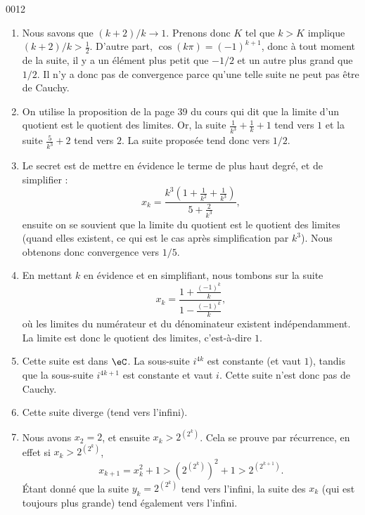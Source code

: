 
\begin{corrige}{0012}

\begin{enumerate}
\item Nous savons que $(k+2)/k\to 1$. Prenons donc $K$ tel que $k>K$ implique $(k+2)/k>\frac{ 1 }{2}$. D'autre part, $\cos(k\pi)=(-1)^{k+1}$, donc à tout moment de la suite, il y a un élément plus petit que $-1/2$ et un autre plus grand que $1/2$. Il n'y a donc pas de convergence parce qu'une telle suite ne peut pas être de Cauchy.

\item On utilise la proposition de la page 39 du cours qui dit que la limite d'un quotient est le quotient des limites. Or, la suite $\frac{1}{ k^3 }+\frac{1}{ k }+1$ tend vers $1$ et la suite $\frac{ 5 }{ k^3 }+2$ tend vers $2$. La suite proposée tend donc vers $1/2$.

\item Le secret est de mettre en évidence le terme de plus haut degré, et de simplifier :
\begin{equation}
	x_k=\frac{ k^3(1+\frac{1}{ k^2 }+\frac{1}{ k^3 }) }{ 5+\frac{ 2 }{ k^3 } },
\end{equation}
ensuite on se souvient que la limite du quotient est le quotient des limites (quand elles existent, ce qui est le cas après simplification par $k^3$). Nous obtenons donc convergence vers $1/5$.

\item 
En mettant $k$ en évidence et en simplifiant, nous tombons sur la suite
\begin{equation}
	x_k=\frac{    1+\frac{ (-1)^k }{ k }   }{  1-\frac{ (-1)^k }{ k }  },
\end{equation}
où les limites du numérateur et du dénominateur existent indépendamment. La limite est donc le quotient des limites, c'est-à-dire $1$.
\item  Cette suite est dans $\eC$. La sous-suite $i^{4k}$ est constante (et vaut $1$), tandis que la sous-suite $i^{4k+1}$ est constante et vaut $i$. Cette suite n'est donc pas de Cauchy.
\item Cette suite diverge (tend vers l'infini).
\item Nous avons $x_2=2$, et ensuite $x_k>2^{(2^k)}$. Cela se prouve par récurrence, en effet si $x_k>2^{(2^k)}$,
\begin{equation}
	x_{k+1}=x_k^2+1>\left( 2^{(2^k)} \right)^2+1>2^{(2^{k+1})}.
\end{equation}
Étant donné que la suite $y_k=2^{(2^k)}$ tend vers l'infini, la suite des $x_k$ (qui est toujours plus grande) tend également vers l'infini.


\end{enumerate}
\end{corrige}
